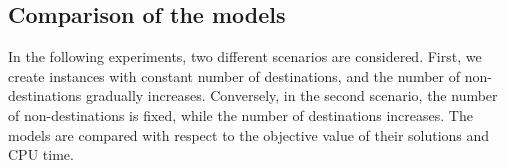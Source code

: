 \subsection{Comparison of the models}
\label{sec:conclusion}
In the following experiments, two different scenarios are considered. First, we create instances with constant number of destinations, and the number of non-destinations gradually increases. Conversely, in the second scenario, the number of non-destinations is fixed, while the number of destinations increases. The models are compared with respect to the objective value of their solutions and CPU time.




                \label{fig:in-basic-time}

